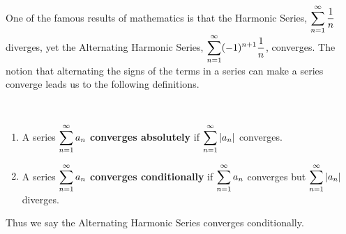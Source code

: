 One of the famous results of mathematics is that the Harmonic Series,\vspace{-.5\baselineskip} $\displaystyle \sum_{n=1}^\infty \frac1n$ diverges, yet the Alternating Harmonic Series, $\displaystyle \sum_{n=1}^\infty (-1)^{n+1}\frac1n$, converges. The notion that alternating the signs of the terms in a series can make a series converge leads us to the following definitions.

\begin{definition}\label{def:abs_converge}%
%
\mbox{}\\[-2\baselineskip]\parbox[t]{\linewidth}{%
\begin{enumerate}
	\item A series $\displaystyle \sum_{n=1}^\infty a_n$ \textbf{converges absolutely} if $\displaystyle \sum_{n=1}^\infty \left\lvert a_n \right\rvert$ converges.
	\item A series $\displaystyle \sum_{n=1}^\infty a_n$ \textbf{converges conditionally} if $\displaystyle \sum_{n=1}^\infty a_n$ converges but $\displaystyle \sum_{n=1}^\infty \left\lvert a_n \right\rvert$ diverges.
\end{enumerate}}
\end{definition}


Thus we say the Alternating Harmonic Series converges conditionally.


